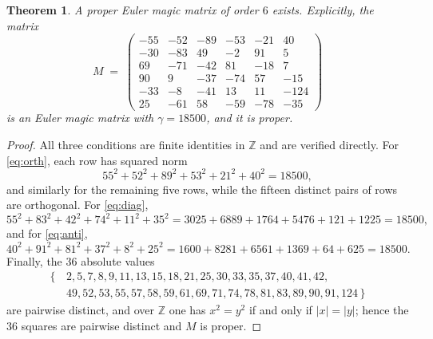 \documentclass[10pt,a4paper]{amsart}
\newtheorem{theorem}{Theorem}
\newcommand{\Z}{\mathbb{Z}}
\begin{document}
\begin{theorem}\label{thm:main}
A proper Euler magic matrix of order $6$ exists. Explicitly, the matrix
\[
M \;=\;
\begin{pmatrix}
-55 & -52 & -89 & -53 & -21 &  40\\
-30 & -83 &  49 &  -2 &  91 &   5\\
 69 & -71 & -42 &  81 & -18 &   7\\
 90 &   9 & -37 & -74 &  57 & -15\\
-33 &  -8 & -41 &  13 &  11 &-124\\
 25 & -61 &  58 & -59 & -78 & -35
\end{pmatrix}
\]
is an Euler magic matrix with $\gamma=18500$, and it is proper.
\end{theorem}

\begin{proof}
All three conditions are finite identities in $\Z$ and are verified directly.
For \eqref{eq:orth}, each row has squared norm
\[
55^2+52^2+89^2+53^2+21^2+40^2=18500,
\]
and similarly for the remaining five rows, while the fifteen distinct pairs of
rows are orthogonal. For \eqref{eq:diag},
\[
55^2+83^2+42^2+74^2+11^2+35^2 = 3025+6889+1764+5476+121+1225 = 18500 ,
\]
and for \eqref{eq:anti},
\[
40^2+91^2+81^2+37^2+8^2+25^2 = 1600+8281+6561+1369+64+625 = 18500 .
\]
Finally, the $36$ absolute values
\[
\begin{aligned}
\{\,&2,5,7,8,9,11,13,15,18,21,25,30,33,35,37,40,41,42,\\
 &49,52,53,55,57,58,59,61,69,71,74,78,81,83,89,90,91,124\,\}
\end{aligned}
\]
are pairwise distinct, and over $\Z$ one has $x^2=y^2$ if and only if
$|x|=|y|$; hence the $36$ squares are pairwise distinct and $M$ is proper.
\end{proof}
\end{document}

